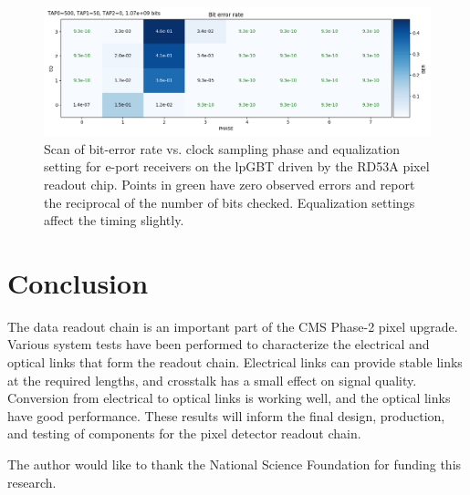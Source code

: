 \documentclass[a4paper,11pt]{article}
\begin{document}
\begin{figure}[htbp]
\centering
\includegraphics[width=1.0\textwidth,origin=c]{../figures/lpGBT_bert.png}
\caption{
\label{fig:lpgbt_bert}
Scan of bit-error rate vs. clock sampling phase and equalization setting for e-port receivers on the lpGBT driven by the RD53A pixel readout chip.
Points in green have zero observed errors and report the reciprocal of the number of bits checked.
Equalization settings affect the timing slightly.
}
\end{figure}

\section{Conclusion}
\label{sec:conclusion}

The data readout chain is an important part of the CMS Phase-2 pixel upgrade.
Various system tests have been performed to characterize the electrical and optical links that form the readout chain.
Electrical links can provide stable links at the required lengths, and crosstalk has a small effect on signal quality.
Conversion from electrical to optical links is working well, and the optical links have good performance.
These results will inform the final design, production, and testing of components for the pixel detector readout chain.


\acknowledgments

The author would like to thank the National Science Foundation for funding this research.

\end{document}
